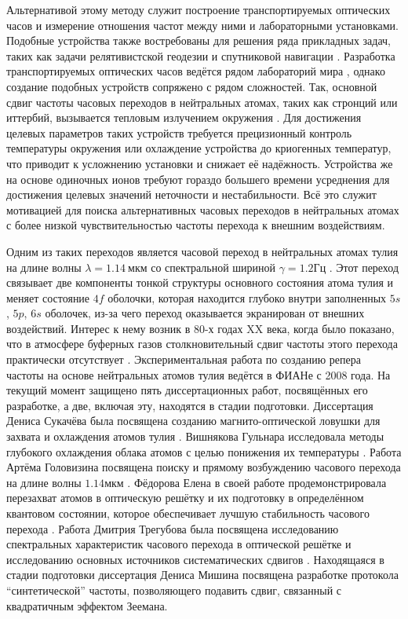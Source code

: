 Альтернативой этому методу служит построение транспортируемых оптических часов и измерение отношения частот между ними и лабораторными установками.
Подобные устройства также востребованы для решения ряда прикладных задач, таких как задачи релятивистской геодезии \cite{grotti2018geodesy} и спутниковой навигации \cite{schuldt2021optical}.
Разработка транспортируемых оптических часов ведётся рядом лабораторий мира \cite{grotti2018geodesy, cao2022compact, stuhler2021opticlock, semerikov2018compact}, однако создание подобных устройств сопряжено с рядом сложностей.
Так, основной сдвиг частоты часовых переходов в нейтральных атомах, таких как стронций или иттербий, вызывается тепловым излучением окружения \cite{lisdat2021blackbody}. 
Для достижения целевых параметров таких устройств требуется прецизионный контроль температуры окружения или охлаждение устройства до криогенных температур, что приводит к усложнению установки и снижает её надёжность.
Устройства же на основе одиночных ионов требуют гораздо большего времени усреднения для достижения целевых значений неточности и нестабильности.
Всё это служит мотивацией для поиска альтернативных часовых переходов в нейтральных атомах с более низкой чувствительностью частоты перехода к внешним воздействиям.

Одним из таких переходов является часовой переход в нейтральных атомах тулия на длине волны $\lambda = 1.14~\unit{мкм}$ со спектральной шириной $\gamma = 1.2\unit{Гц}$ \cite{golovizin2019inner}.
Этот переход связывает две компоненты тонкой структуры основного состояния атома тулия и меняет состояние $4f$ оболочки, которая находится глубоко внутри заполненных $5s$, $5p$, $6s$ оболочек, из-за чего переход оказывается экранирован от внешних воздействий. 
Интерес к нему возник в 80-х годах XX века, когда было показано, что в атмосфере буферных газов столкновительный сдвиг частоты этого перехода практически отсутствует \cite{александров1983неуширяемая}.
Экспериментальная работа по созданию репера частоты на основе нейтральных атомов тулия ведётся в ФИАНе с 2008 года. 
На текущий момент защищено пять диссертационных работ, посвящённых его разработке, а две, включая эту, находятся в стадии подготовки. 
Диссертация Дениса Сукачёва была посвящена созданию магнито-оптической ловушки для захвата и охлаждения атомов тулия \cite{сукачёв2013лазерное}. 
Вишнякова Гульнара исследовала методы глубокого охлаждения облака атомов с целью понижения их температуры \cite{вишнякова2016вторичное}. 
Работа Артёма Головизина посвящена поиску и прямому возбуждению часового перехода на длине волны $1.14\unit{мкм}$ \cite{головизин2017прямое}.
Фёдорова Елена в своей работе продемонстрировала перезахват атомов в оптическую решётку и их подготовку в определённом квантовом состоянии, которое обеспечивает лучшую стабильность часового перехода \cite{фёдорова2019исследование}. 
Работа Дмитрия Трегубова была посвящена исследованию спектральных характеристик часового перехода в оптической решётке и исследованию основных источников систематических сдвигов \cite{трегубов2020часовой}. 
Находящаяся в стадии подготовки диссертация Дениса Мишина посвящена разработке протокола ``синтетической'' частоты, позволяющего подавить сдвиг, связанный с квадратичным эффектом Зеемана.

